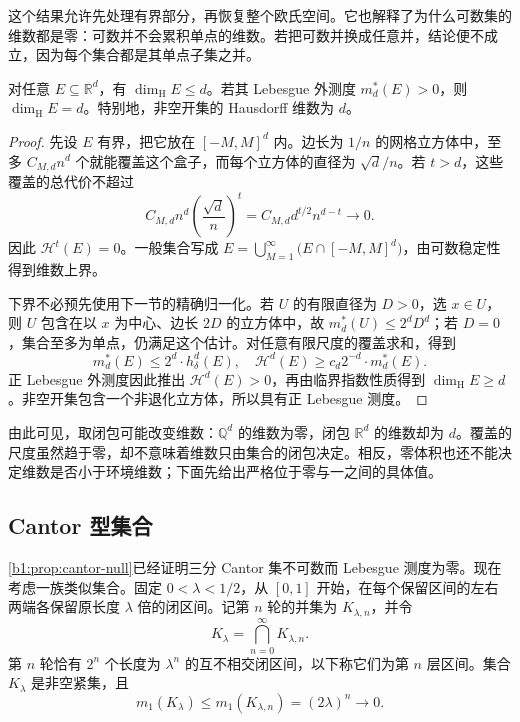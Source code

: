 这个结果允许先处理有界部分，再恢复整个欧氏空间。它也解释了为什么可数集的维数都是零：可数并不会累积单点的维数。若把可数并换成任意并，结论便不成立，因为每个集合都是其单点子集之并。

\begin{proposition}
\label{b1:prop:euclidean-hausdorff-dimension}
对任意 \(E\subseteq\mathbb R^d\)，有 \(\dim_{\mathrm H}E\leq d\)。若其 Lebesgue 外测度 \(m_d^*(E)>0\)，则 \(\dim_{\mathrm H}E=d\)。特别地，非空开集的 Hausdorff 维数为 \(d\)。
\end{proposition}
\begin{proof}
先设 \(E\) 有界，把它放在 \([-M,M]^d\) 内。边长为 \(1/n\) 的网格立方体中，至多 \(C_{M,d}n^d\) 个就能覆盖这个盒子，而每个立方体的直径为 \(\sqrt d/n\)。若 \(t>d\)，这些覆盖的总代价不超过
\[
C_{M,d}n^d\left(\frac{\sqrt d}{n}\right)^t
=C_{M,d}d^{t/2}n^{d-t}\longrightarrow0.
\]
因此 \(\mathcal H^t(E)=0\)。一般集合写成 \(E=\bigcup_{M=1}^{\infty}\bigl(E\cap[-M,M]^d\bigr)\)，由可数稳定性得到维数上界。

下界不必预先使用下一节的精确归一化。若 \(U\) 的有限直径为 \(D>0\)，选 \(x\in U\)，则 \(U\) 包含在以 \(x\) 为中心、边长 \(2D\) 的立方体中，故 \(m_d^*(U)\leq2^dD^d\)；若 \(D=0\)，集合至多为单点，仍满足这个估计。对任意有限尺度的覆盖求和，得到
\[
m_d^*(E)\leq2^d \cdot h^d_\delta(E),
\quad
\mathcal H^d(E)\geq c_d2^{-d}\cdot m_d^*(E).
\]
正 Lebesgue 外测度因此推出 \(\mathcal H^d(E)>0\)，再由临界指数性质得到 \(\dim_{\mathrm H}E\geq d\)。非空开集包含一个非退化立方体，所以具有正 Lebesgue 测度。
\end{proof}

由此可见，取闭包可能改变维数：\(\mathbb Q^d\) 的维数为零，闭包 \(\mathbb R^d\) 的维数却为 \(d\)。覆盖的尺度虽然趋于零，却不意味着维数只由集合的闭包决定。相反，零体积也还不能决定维数是否小于环境维数；下面先给出严格位于零与一之间的具体值。

\subsection{Cantor 型集合}
\label{b1:subsec:150204}

\cref{b1:prop:cantor-null}已经证明三分 Cantor 集不可数而 Lebesgue 测度为零。现在考虑一族类似集合。固定 \(0<\lambda<1/2\)，从 \([0,1]\) 开始，在每个保留区间的左右两端各保留原长度 \(\lambda\) 倍的闭区间。记第 \(n\) 轮的并集为 \(K_{\lambda,n}\)，并令
\[
K_\lambda=\bigcap_{n=0}^{\infty}K_{\lambda,n}.
\]
第 \(n\) 轮恰有 \(2^n\) 个长度为 \(\lambda^n\) 的互不相交闭区间，以下称它们为第 \(n\) 层区间。集合 \(K_\lambda\) 是非空紧集，且
\[
m_1(K_\lambda)\leq m_1(K_{\lambda,n})=(2\lambda)^n\longrightarrow0.
\]

